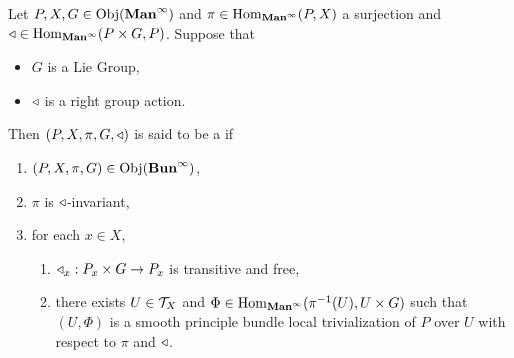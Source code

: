 \documentclass{book}
\begin{document}
\begin{defn} 
	Let $P,X, G \in \operatorname{Obj}(\operatorname*{\text{\textbf{Man}}^{\infty}})$ and $\pi \in \operatorname{Hom}_{\operatorname*{\text{\textbf{Man}}^{\infty}}}(P, X)$ a surjection and $\triangleleft \in \operatorname{Hom}_{\operatorname*{\text{\textbf{Man}}^{\infty}}}(P \times G , P)$. Suppose that 
	\begin{itemize}
		\item $G$ is a Lie Group,
		\item $\triangleleft$ is a right group action.
	\end{itemize}
	Then $(P, X, \pi, G, \triangleleft)$ is said to be a  if 
	\begin{enumerate}
		\item $(P, X, \pi, G) \in \operatorname{Obj}(\operatorname*{\text{\textbf{Bun}}^{\infty}})$, 
		\item $\pi$ is $\triangleleft$-invariant,
		\item for each $x \in X$,
		\begin{enumerate}
			\item  $\triangleleft_x: P_x \times G \rightarrow P_x$ is transitive and free,
			\item  there exists $U \in \mathcal{T}_X$ and $\Phi \in \operatorname{Hom}_{\operatorname*{\text{\textbf{Man}}^{\infty}}}(\pi^{-1}(U), U \times G)$ such that $(U, \Phi)$ is a smooth principle bundle local trivialization of $P$ over $U$ with respect to $\pi$ and $\triangleleft$.
		\end{enumerate}
	\end{enumerate}
\end{defn}




\begin{ex}
	
\end{ex}
\end{document}
